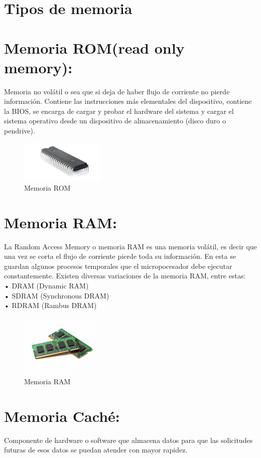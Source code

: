 \documentclass{article}
\begin{document}
\section*{Tipos de memoria}

\section{Memoria ROM(read only memory):} 
Memoria no volátil o sea que si deja de haber flujo de corriente no pierde información. Contiene las instrucciones más elementales del dispositivo, contiene la BIOS, se encarga de cargar y probar el hardware del sistema y cargar el sistema operativo desde un dispositivo de almacenamiento (disco duro o pendrive).

\begin{figure}[h]
\includegraphics[width=4cm]{rom.jpg}
\centering
\caption{Memoria ROM}
\end{figure}

\section{Memoria RAM:}
La Random Access Memory o memoria RAM es una memoria volátil, es decir que una vez se corta el flujo de corriente pierde toda su información. En esta se guardan algunos procesos temporales que el micropocesador debe ejecutar constantemente. Existen diversas variaciones de la memoria RAM, entre estas:\\
•	DRAM (Dynamic RAM)\\
•	SDRAM (Synchronous DRAM)\\
•	RDRAM (Rambus DRAM)\\

\begin{figure}[h]
\includegraphics[width=4cm]{memoriaRAM.jpg}
\centering
\caption{Memoria RAM}
\end{figure}

\section{Memoria Caché: } 
Componente de hardware o software que almacena datos para que las solicitudes futuras de esos datos se puedan atender con mayor rapidez.
\end{document}
